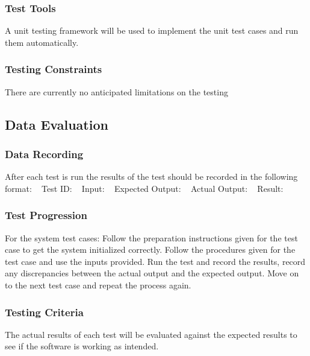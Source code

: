 \documentclass[12pt]{article}
\begin{document}
\subsubsection{Test Tools}
A unit testing framework will be used to implement the unit test cases and run them automatically.

\subsubsection{ Testing Constraints}
There are currently no anticipated limitations on the testing

\subsection{ Data Evaluation}

\subsubsection{Data Recording}
After each test is run the results of the test should be recorded in the following format: 
~\newline
Test ID: 
~\newline
Input:
~\newline
Expected Output:
~\newline
Actual Output:
~\newline
Result: 

\subsubsection{Test Progression}

For the system test cases: Follow the preparation instructions given for the test case to get the system
initialized correctly. Follow the procedures given for the test case and use the inputs provided. Run the test and
record the results, record any discrepancies between the actual output and the expected output. Move on to the next
test case and repeat the process again.

\subsubsection{ Testing Criteria}
The actual results of each test will be evaluated against the expected results to see if the software is working as 
intended.
\end{document}
